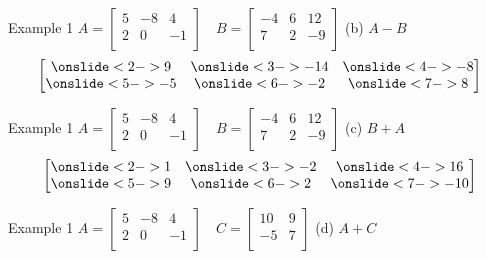 \documentclass[t]{beamer}
\begin{document}
\begin{frame}{Example 1 \quad $A =
\begin{bmatrix}
5   &   -8  &   4   \\
2   &   0   &   -1  \\
\end{bmatrix}
\quad 
B = 
\begin{bmatrix}
-4  &   6   &   12  \\
7   &   2   &   -9  \\
\end{bmatrix}$}
(b) \quad $A - B$
\[
\begin{bmatrix}
\onslide<2->{9} & \onslide<3->{-14} & \onslide<4->{-8} \\
\onslide<5->{-5} & \onslide<6->{-2} & \onslide<7->{8} \\
\end{bmatrix}
\]
\end{frame}

\begin{frame}{Example 1 \quad $A =
\begin{bmatrix}
5   &   -8  &   4   \\
2   &   0   &   -1  \\
\end{bmatrix}
\quad 
B = 
\begin{bmatrix}
-4  &   6   &   12  \\
7   &   2   &   -9  \\
\end{bmatrix}$}
(c) \quad $B + A$
\[
\begin{bmatrix}
\onslide<2->{1} & \onslide<3->{-2} & \onslide<4->{16} \\
\onslide<5->{9} & \onslide<6->{2} & \onslide<7->{-10} \\
\end{bmatrix}
\]
\end{frame}

\begin{frame}{Example 1 \quad $A =
\begin{bmatrix}
5   &   -8  &   4   \\
2   &   0   &   -1  \\
\end{bmatrix}
\quad 
C =
\begin{bmatrix}
10  &   9   \\
-5  &   7   \\
\end{bmatrix}$}
(d) \quad $A + C$	\newline\\
\end{frame}
\end{document}
